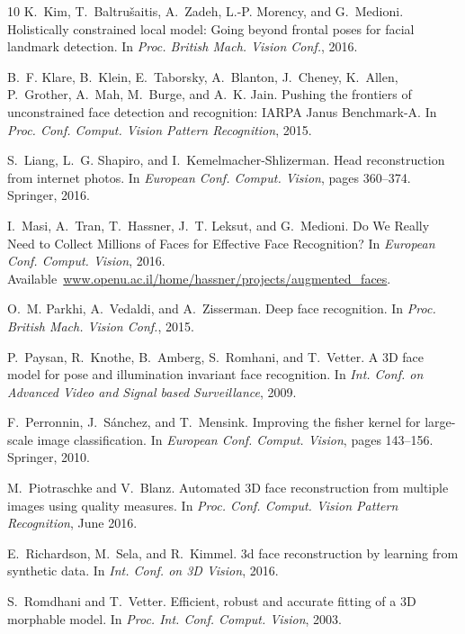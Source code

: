 \documentclass[10pt,twocolumn,letterpaper]{article}
\begin{document}
{\begin{thebibliography}{10}
K.~Kim, T.~Baltrušaitis, A.~Zadeh, L.-P. Morency, and G.~Medioni.
\newblock Holistically constrained local model: Going beyond frontal poses for
  facial landmark detection.
\newblock In {\em Proc. British Mach. Vision Conf.}, 2016.

B.~F. Klare, B.~Klein, E.~Taborsky, A.~Blanton, J.~Cheney, K.~Allen,
  P.~Grother, A.~Mah, M.~Burge, and A.~K. Jain.
\newblock Pushing the frontiers of unconstrained face detection and
  recognition: {IARPA} {J}anus {B}enchmark-{A}.
\newblock In {\em Proc. Conf. Comput. Vision Pattern Recognition}, 2015.

S.~Liang, L.~G. Shapiro, and I.~Kemelmacher-Shlizerman.
\newblock Head reconstruction from internet photos.
\newblock In {\em European Conf. Comput. Vision}, pages 360--374. Springer,
  2016.

I.~Masi, A.~Tran, T.~Hassner, J.~T. Leksut, and G.~Medioni.
\newblock Do {W}e {R}eally {N}eed to {C}ollect {M}illions of {F}aces for
  {E}ffective {F}ace {R}ecognition?
\newblock In {\em European Conf. Comput. Vision}, 2016.
\newblock
  Available~\url{www.openu.ac.il/home/hassner/projects/augmented_faces}.

O.~M. Parkhi, A.~Vedaldi, and A.~Zisserman.
\newblock Deep face recognition.
\newblock In {\em Proc. British Mach. Vision Conf.}, 2015.

P.~Paysan, R.~Knothe, B.~Amberg, S.~Romhani, and T.~Vetter.
\newblock A {3D} face model for pose and illumination invariant face
  recognition.
\newblock In {\em Int. Conf. on Advanced Video and Signal based Surveillance},
  2009.

F.~Perronnin, J.~S{\'a}nchez, and T.~Mensink.
\newblock Improving the fisher kernel for large-scale image classification.
\newblock In {\em European Conf. Comput. Vision}, pages 143--156. Springer,
  2010.

M.~Piotraschke and V.~Blanz.
\newblock Automated {3D} face reconstruction from multiple images using quality
  measures.
\newblock In {\em Proc. Conf. Comput. Vision Pattern Recognition}, June 2016.

E.~Richardson, M.~Sela, and R.~Kimmel.
\newblock 3d face reconstruction by learning from synthetic data.
\newblock In {\em Int. Conf. on 3D Vision}, 2016.

S.~Romdhani and T.~Vetter.
\newblock Efficient, robust and accurate fitting of a {3D} morphable model.
\newblock In {\em Proc. Int. Conf. Comput. Vision}, 2003.


\end{thebibliography}}
\end{document}

